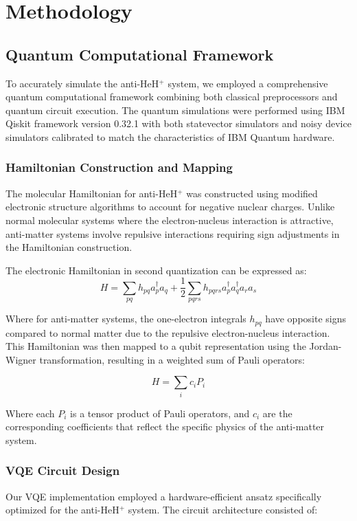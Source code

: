 \documentclass[10pt,twocolumn,a4paper]{article}
\begin{document}
\section{Methodology}
\subsection{Quantum Computational Framework}
To accurately simulate the anti-HeH$^+$ system, we employed a comprehensive quantum computational framework combining both classical preprocessors and quantum circuit execution. The quantum simulations were performed using IBM Qiskit framework version 0.32.1 with both statevector simulators and noisy device simulators calibrated to match the characteristics of IBM Quantum hardware.

\subsubsection{Hamiltonian Construction and Mapping}
The molecular Hamiltonian for anti-HeH$^+$ was constructed using modified electronic structure algorithms to account for negative nuclear charges. Unlike normal molecular systems where the electron-nucleus interaction is attractive, anti-matter systems involve repulsive interactions requiring sign adjustments in the Hamiltonian construction.

The electronic Hamiltonian in second quantization can be expressed as:
\begin{equation}
    H = \sum_{pq} h_{pq} a_p^\dagger a_q + \frac{1}{2}\sum_{pqrs} h_{pqrs} a_p^\dagger a_q^\dagger a_r a_s
\end{equation}

Where for anti-matter systems, the one-electron integrals $h_{pq}$ have opposite signs compared to normal matter due to the repulsive electron-nucleus interaction. This Hamiltonian was then mapped to a qubit representation using the Jordan-Wigner transformation, resulting in a weighted sum of Pauli operators:

\begin{equation}
    H = \sum_i c_i P_i
\end{equation}

Where each $P_i$ is a tensor product of Pauli operators, and $c_i$ are the corresponding coefficients that reflect the specific physics of the anti-matter system.

\subsubsection{VQE Circuit Design}
Our VQE implementation employed a hardware-efficient ansatz specifically optimized for the anti-HeH$^+$ system. The circuit architecture consisted of:
\end{document}
